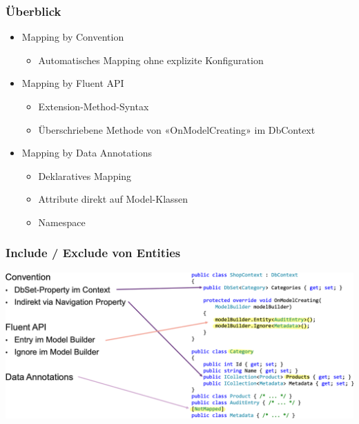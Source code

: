\subsubsection{Überblick}
\begin{itemize}
    \item Mapping by Convention
    \begin{itemize}
        \item Automatisches Mapping ohne explizite Konfiguration
    \end{itemize}
    \item Mapping by Fluent API
    \begin{itemize}
        \item Extension-Method-Syntax
        \item Überschriebene Methode von «OnModelCreating» im DbContext
    \end{itemize}
    \item Mapping by Data Annotations
    \begin{itemize}
        \item Deklaratives Mapping
        \item Attribute direkt auf Model-Klassen
        \item Namespace
    \end{itemize}
\end{itemize}

\subsubsection{Include / Exclude von Entities}
\begin{center}
    \includegraphics[scale=.35]{graphic/efc/Include Exclude von Entities.png}
\end{center}
\vspace{-8pt}

